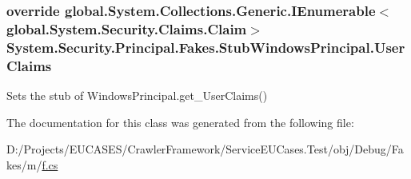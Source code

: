 \hypertarget{class_system_1_1_security_1_1_principal_1_1_fakes_1_1_stub_windows_principal_a3c49849dcf4f14c715aff1d8ee981dba}{
\subsubsection[{User\-Claims}]{\setlength{\rightskip}{0pt plus 5cm}override global.\-System.\-Collections.\-Generic.\-I\-Enumerable$<$global.\-System.\-Security.\-Claims.\-Claim$>$ System.\-Security.\-Principal.\-Fakes.\-Stub\-Windows\-Principal.\-User\-Claims\hspace{0.3cm}{\ttfamily [get]}}}\label{class_system_1_1_security_1_1_principal_1_1_fakes_1_1_stub_windows_principal_a3c49849dcf4f14c715aff1d8ee981dba}


Sets the stub of Windows\-Principal.\-get\-\_\-\-User\-Claims()



The documentation for this class was generated from the following file\-:\begin{DoxyCompactItemize}
\item 
D\-:/\-Projects/\-E\-U\-C\-A\-S\-E\-S/\-Crawler\-Framework/\-Service\-E\-U\-Cases.\-Test/obj/\-Debug/\-Fakes/m/\hyperlink{m_2f_8cs}{f.\-cs}\end{DoxyCompactItemize}
